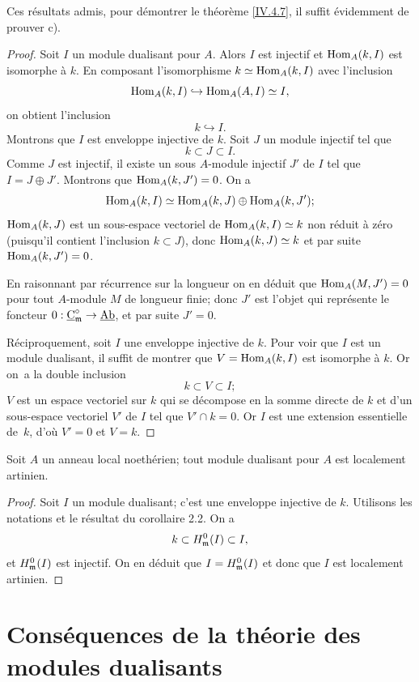 Ces r\'esultats admis, pour d\'emontrer le th\'eor\`eme \ref{IV.4.7}, il suffit \'evidemment de prouver c).

\begin{proof}
Soit $I$ un module dualisant pour $A$. Alors $I$ est injectif et $\operatorname{Hom}_{A}(k, I)$ est isomorphe \`a $k$. En composant l'isomorphisme $k\simeq \operatorname{Hom}_{A}(k, I)$ avec l'inclusion
$$
\operatorname{Hom}_{A}(k, I)\hookrightarrow \operatorname{Hom}_{A}(A, I)\simeq I,
$$
on obtient l'inclusion
$$
k\hookrightarrow I.
$$
Montrons que $I$ est enveloppe injective de $k$. Soit $J$ un module injectif tel que
$$
k\subset J\subset I.
$$
Comme $J$ est injectif, il existe un sous $A$-module injectif $J'$ de $I$ tel que $I=J\oplus J'$. Montrons que $\operatorname{Hom}_{A}(k, J')=0$. On a
$$
\operatorname{Hom}_{A}(k, I)\simeq \operatorname{Hom}_{A}(k, J)\oplus \operatorname{Hom}_{A}(k, J');
$$
$\operatorname{Hom}_{A}(k, J)$ est un sous-espace vectoriel de $\operatorname{Hom}_{A}(k, I)\simeq k$ non r\'eduit \`a z\'ero (puisqu'il contient l'inclusion $k\subset J$), donc $\operatorname{Hom}_{A}(k, J)\simeq k$ et par suite $\operatorname{Hom}_{A}(k, J')=0$.

En raisonnant par r\'ecurrence sur la longueur on en d\'eduit que $\operatorname{Hom}_{A}(M, J')=0$ pour tout $A$-module $M$ de longueur finie; donc $J'$ est l'objet qui repr\'esente le foncteur $0:\ccat_{\mm}^{\circ}\to \Ab$, et par suite $J'=0$.

R\'eciproquement, soit $I$ une enveloppe injective de $k$. Pour voir que $I$ est un module dualisant, il suffit de montrer \ignorespaces que $V=\operatorname{Hom}_{A}(k, I)$ est isomorphe \`a $k$. Or on~a la double inclusion
$$
k\subset V\subset I;
$$
$V$ est un espace vectoriel sur $k$ qui se d\'ecompose en la somme directe de $k$ et d'un sous-espace vectoriel $V'$ de $I$ tel que $V'\cap k=0$. Or $I$ est une extension essentielle de~$k$, d'o\`u $V'=0$ et $V=k$.
\skipqed
\end{proof}

\begin{corollaire} \label{IV.4.9}
Soit $A$ un anneau local noeth\'erien; tout module dualisant pour $A$ est localement artinien.
\end{corollaire}

\begin{proof}
Soit $I$ un module dualisant; c'est une enveloppe injective de $k$. Utilisons les notations et le r\'esultat du corollaire 2.2. On a
$$
k\subset H^{0}_{\mathfrak{m}}(I)\subset I,
$$
et $H^{0}_{\mathfrak{m}}(I)$ est injectif. On en d\'eduit que $I=H^{0}_{\mathfrak{m}}(I)$ et donc que $I$ est localement artinien.
\skipqed
\end{proof}

\section{Cons\'equences de la th\'eorie des modules dualisants} \label{IV.5}

